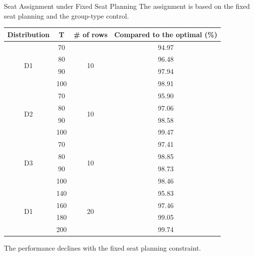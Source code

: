     \begin{frame}{Seat Assignment under Fixed Seat Planning}
      \scriptsize
      The assignment is based on the fixed seat planning and the group-type control.
      \begin{table}[ht]
        \centering
        \begin{tabular}{|c|c|c|c|}
        \hline
        Distribution & T &  \# of rows & Compared to the optimal (\%)  \\
        \hline
        \multirow{4}{*}{D1} & 70    & \multirow{4}{*}{10} & 94.97  \\
        & 80     &  & 96.48   \\
        & 90     &  & 97.94   \\
        & 100     &  & 98.91   \\
        \hline
        \multirow{4}{*}{D2} & 70    & \multirow{4}{*}{10} & 95.90 \\
        & 80     &  & 97.06  \\
        & 90     &  & 98.58  \\
        & 100     &  & 99.47 \\
        \hline
        \multirow{4}{*}{D3} & 70    & \multirow{4}{*}{10} & 97.41  \\
        & 80     &  & 98.85  \\
        & 90     &  & 98.73  \\
        & 100     &  & 98.46  \\
        \hline
        \multirow{4}{*}{D1} & 140   & \multirow{4}{*}{20} & 95.83  \\
        & 160     &  & 97.46  \\
        & 180     &  & 99.05  \\
        & 200    &  & 99.74  \\
        \hline
        \end{tabular}
      \end{table}
      The performance declines with the fixed seat planning constraint.
    \end{frame}
